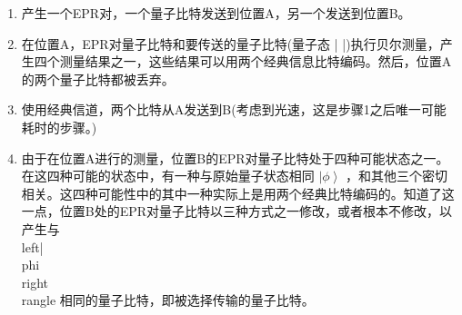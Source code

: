 \begin{enumerate}
\item 产生一个EPR对，一个量子比特发送到位置A，另一个发送到位置B。
\item 在位置A，EPR对量子比特和要传送的量子比特(量子态 {\displaystyle |\phi \rangle } {\displaystyle |\phi \rangle })执行贝尔测量，产生四个测量结果之一，这些结果可以用两个经典信息比特编码。然后，位置A的两个量子比特都被丢弃。
\item 使用经典信道，两个比特从A发送到B(考虑到光速，这是步骤1之后唯一可能耗时的步骤。)
\item 由于在位置A进行的测量，位置B的EPR对量子比特处于四种可能状态之一。在这四种可能的状态中，有一种与原始量子状态相同 $\left| \phi \right\rangle
 $ ，和其他三个密切相关。这四种可能性中的其中一种实际上是用两个经典比特编码的。知道了这一点，位置B处的EPR对量子比特以三种方式之一修改，或者根本不修改，以产生与\\left| \\phi \\right\\rangle
    相同的量子比特，即被选择传输的量子比特。
\end{enumerate}

